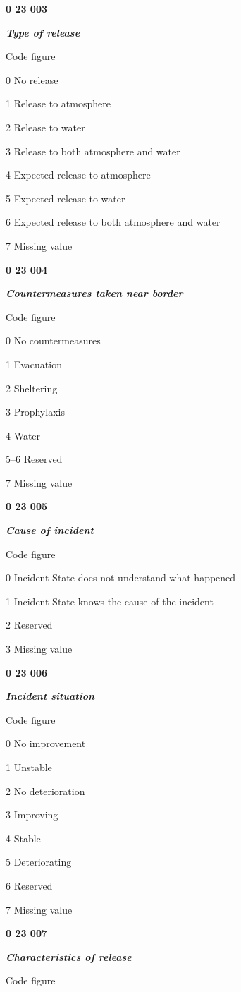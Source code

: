 \textbf{0 23 003}

\emph{\textbf{Type of release}}

Code figure

0 No release

1 Release to atmosphere

2 Release to water

3 Release to both atmosphere and water

4 Expected release to atmosphere

5 Expected release to water

6 Expected release to both atmosphere and water

7 Missing value

\textbf{0 23 004}

\emph{\textbf{Countermeasures taken near border}}

Code figure

0 No countermeasures

1 Evacuation

2 Sheltering

3 Prophylaxis

4 Water

5--6 Reserved

7 Missing value

\textbf{0 23 005}

\emph{\textbf{Cause of incident}}

Code figure

0 Incident State does not understand what happened

1 Incident State knows the cause of the incident

2 Reserved

3 Missing value

\textbf{0 23 006}

\emph{\textbf{Incident situation}}

Code figure

0 No improvement

1 Unstable

2 No deterioration

3 Improving

4 Stable

5 Deteriorating

6 Reserved

7 Missing value

\textbf{0 23 007}

\emph{\textbf{Characteristics of release}}

Code figure

